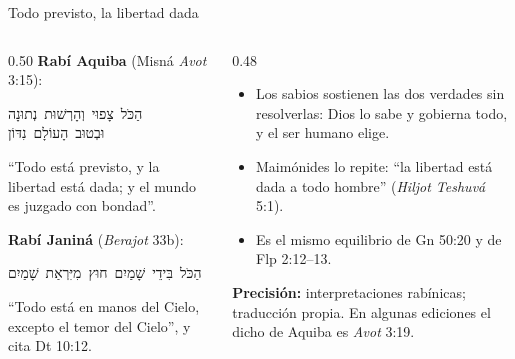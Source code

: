 \documentclass[hyperref={bookmarks=false},aspectratio=169]{beamer}
\newcommand{\heb}[1]{\mbox{\foreignlanguage{hebrew}{#1}}}
\newcommand{\precision}[1]{{\footnotesize\color{gris}\textbf{Precisión:} #1}}
\begin{document}
\begin{frame}{Todo previsto, la libertad dada}
\begin{columns}[t,onlytextwidth]
\begin{column}{0.50\textwidth}\small
\textbf{Rabí Aquiba} (Misná \emph{Avot} 3:15):
\begin{center}\heb{הַכֹּל צָפוּי וְהָרְשׁוּת נְתוּנָה}\\ \heb{וּבְטוּב הָעוֹלָם נִדּוֹן}\end{center}
``Todo está previsto, y la libertad está dada; y el mundo es juzgado con bondad''.\par\medskip
\textbf{Rabí Janiná} (\emph{Berajot} 33b):
\begin{center}\heb{הַכֹּל בִּידֵי שָׁמַיִם חוּץ מִיִּרְאַת שָׁמַיִם}\end{center}
``Todo está en manos del Cielo, excepto el temor del Cielo'', y cita Dt 10:12.
\end{column}
\begin{column}{0.48\textwidth}\small
\begin{itemize}
\item Los sabios sostienen las dos verdades sin resolverlas: Dios lo sabe y gobierna todo, y el ser humano elige.
\item Maimónides lo repite: ``la libertad está dada a todo hombre'' (\emph{Hiljot Teshuvá} 5:1).
\item Es el mismo equilibrio de Gn 50:20 y de Flp 2:12--13.
\end{itemize}
\precision{interpretaciones rabínicas; traducción propia. En algunas ediciones el dicho de Aquiba es \emph{Avot} 3:19.}
\end{column}
\end{columns}
\end{frame}
\end{document}
